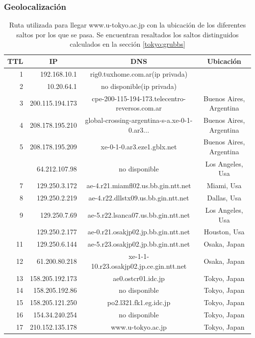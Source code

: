 \subsubsection{Geolocalización}

\begin{table}[H]
    \begin{center}
        \begin{tabular}{| r | r | c | c |}
  \hline
  {\bf TTL} & \multicolumn{1}{|c|}{\bf IP} & {\bf DNS} & {\bf Ubicación}\\
  \hline
\hline 1  & 192.168.10.1 & rig0.tuxhome.com.ar(ip privada) &\\
\hline 2  & 10.20.64.1 & no disponible(ip privada) &\\
\hline 3  & 200.115.194.173 & cpe-200-115-194-173.telecentro-reversos.com.ar & Buenos Aires, Argentina\\
\hline 4  & 208.178.195.210 & global-crossing-argentina-s-a.xe-0-1-0.ar3... & Buenos Aires, Argentina \\
\hline 5  & 208.178.195.209 & xe-0-1-0.ar3.eze1.gblx.net & Buenos Aires, Argentina \\
\rowcolor{blue!25}\hline 6  & 64.212.107.98 & no disponible  & Los Angeles, Usa\\
\hline 7  & 129.250.3.172 & ae-4.r21.miamfl02.us.bb.gin.ntt.net & Miami, Usa \\
\hline 8  & 129.250.2.219 & ae-4.r22.dllstx09.us.bb.gin.ntt.net & Dallas, Usa\\
\hline 9  & 129.250.7.69 & ae-5.r22.lsanca07.us.bb.gin.ntt.net & Los Angeles, Usa\\
\rowcolor{blue!25}\hline 10  & 129.250.2.177 & ae-0.r21.osakjp02.jp.bb.gin.ntt.net & Houston, Usa\\
\hline 11  & 129.250.6.144 & ae-5.r23.osakjp02.jp.bb.gin.ntt.net & Osaka, Japan\\
\hline 12  & 61.200.80.218 & xe-1-1-10.r23.osakjp02.jp.ce.gin.ntt.net & Osaka, Japan\\
\hline 13  & 158.205.192.173 & ae0.ostcr01.idc.jp & Tokyo, Japan\\
\hline 14  & 158.205.192.86 & no disponible  & Tokyo, Japan\\
\hline 15  & 158.205.121.250 & po2.l321.fk1.eg.idc.jp & Tokyo, Japan\\
\hline 16  & 154.34.240.254 & no disponible & Tokyo, Japan\\
\hline 17  & 210.152.135.178 & www.u-tokyo.ac.jp & Tokyo, Japan\\
\hline
        \end{tabular}
        \caption{Ruta utilizada para llegar www.u-tokyo.ac.jp con la ubicación de los diferentes saltos por los que se pasa. Se encuentran resaltados los saltos distinguidos calculados en la sección \ref{tokyo:grubbs}}
        \label{table:tokyo} 
    \end{center}
\end{table}



